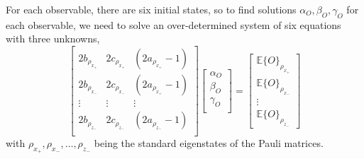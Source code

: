 \documentclass[12pt]{iopart}
\begin{document}
For each observable, there are six initial states, so to find solutions $\alpha_{O}, \beta_{O}, \gamma_{O}$ for each observable, we need to solve an over-determined system of six equations with three unknowns,
\begin{equation} \label{eq:overdetermined-full-definition}
    \left[\begin{array}{ccc}
            2b_{\rho_{x_+}} & 2c_{\rho_{x_+}} & (2a_{\rho_{x_+}} - 1) \\
            2b_{\rho_{x_-}} & 2c_{\rho_{x_-}} & (2a_{\rho_{x_+}} - 1) \\
            \vdots          & \vdots          & \vdots                \\
            2b_{\rho_{z_-}} & 2c_{\rho_{z_-}} & (2a_{\rho_{z_-}} - 1) \\
        \end{array}\right]
    \left[\begin{array}{c}
            \alpha_{O} \\
            \beta _{O} \\
            \gamma_{O} \\
        \end{array}\right]
    =
    \left[\begin{array}{c}
            \mathbb{E}\{O\}_{\rho_{x_+}} \\
            \mathbb{E}\{O\}_{\rho_{x_-}} \\
            \vdots                       \\
            \mathbb{E}\{O\}_{\rho_{z_-}}
        \end{array}\right]
\end{equation}
with $\rho_{x_+}, \rho_{x_-}, \ldots, \rho_{z_-}$ being the standard eigenstates of the Pauli matrices.

\end{document}
